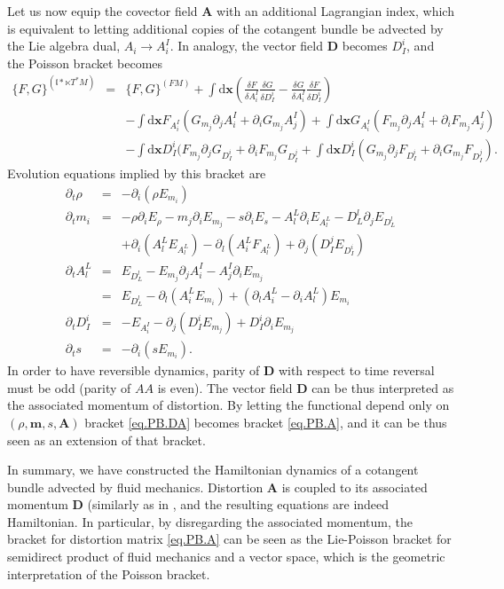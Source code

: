 \documentclass[
10pt, %
a4paper, %
oneside, %
headinclude,footinclude, %
BCOR5mm, %
]{scrartcl}
\newcommand{\xx}{\mathbf{x}}
\newcommand{\dx}{\mathrm{d}\xx}
\newcommand{\mm}{\mathbf{m}}
\renewcommand{\AA}{\mathbf{A}}
\newcommand{\DD}{\mathbf{D}}
\newcommand{\LA}{\mathfrak{l}}
\begin{document}
 Let us now equip the covector field $\AA$ with an additional Lagrangian index, which is equivalent to letting additional copies of the cotangent bundle be advected by the Lie algebra dual, $A_i \rightarrow A^I_i$. In analogy, the vector field $\DD$ becomes $D^i_I$, and the Poisson bracket becomes
 \begin{eqnarray}
	\{F,G\}^{(\LA*\ltimes T^*M)} &=& \{F,G\}^{(FM)} 
    + \int\dx \left(\frac{\delta F}{\delta A^I_i}\frac{\delta G}{\delta D^i_I}-\frac{\delta G}{\delta A^I_i}\frac{\delta F}{\delta D^i_I}\right)\\
	&&-\int\dx  F_{A^I_i} (G_{m_j} \partial_j A^I_i + \partial_i G_{m_j}A^I_j)
	+\int\dx  G_{A^I_i} (F_{m_j} \partial_j A^I_i + \partial_i F_{m_j}A^I_j)\nonumber\\
	&&- \int\dx D^i_I(F_{m_j} \partial_j G_{D^i_I} + \partial_i F_{m_j} G_{D^j_I}
   + \int\dx D^i_I(G_{m_j} \partial_j F_{D^i_I} + \partial_i G_{m_j} F_{D^j_I}).\nonumber
\end{eqnarray}
Evolution equations implied by this bracket are
\begin{subequations}\label{eq.PB.DA}
\begin{eqnarray}
	\partial_t \rho &=& -\partial_i(\rho E_{m_i})\\
	\partial_t m_i &=& -\rho\partial_i E_\rho - m_j \partial_i E_{m_j} -s \partial_i E_s - A^L_l\partial_i E_{A^L_l} -D^l_L \partial_j E_{D^l_L}\nonumber\\
		&&+\partial_i(A^L_l E_{A^L_l}) - \partial_l(A^L_i F_{A^L_l}) +\partial_j(D^j_I E_{D^i_I})\\
	\partial_t A^L_l &=& E_{D^l_L} -E_{m_j}\partial_j A^I_i -A^I_j \partial_i E_{m_j}\nonumber\\
	 &=& E_{D^l_L} -\partial_l (A^L_i E_{m_i}) + (\partial_l A^L_i - \partial_i A^L_l) E_{m_i}\\
	 \partial_t D^i_I &=& -E_{A^I_i} -\partial_j(D^i_I E_{m_j})+D^i_I\partial_i E_{m_j}\\
	\partial_t s &=& -\partial_i(s E_{m_i}).
\end{eqnarray}
\end{subequations}
In order to have reversible dynamics, parity of $\DD$ with respect to time reversal must be odd (parity of $AA$ is even). The vector field $\DD$ can be thus interpreted as the associated momentum of distortion. By letting the functional depend only on $(\rho,\mm,s,\AA)$ bracket \eqref{eq.PB.DA} becomes bracket \eqref{eq.PB.A}, and it can be thus seen as an extension of that bracket.

In summary, we have constructed the Hamiltonian dynamics of a cotangent bundle advected by fluid mechanics. Distortion $\AA$ is coupled to its associated momentum $\DD$ (similarly as in \cite{Ilya-torsion}, and the resulting equations are indeed Hamiltonian. In particular, by disregarding the associated momentum, the bracket for distortion matrix \eqref{eq.PB.A} can be seen as the Lie-Poisson bracket for semidirect product of fluid mechanics and a vector space, which is the geometric interpretation of the Poisson bracket.
\end{document}
